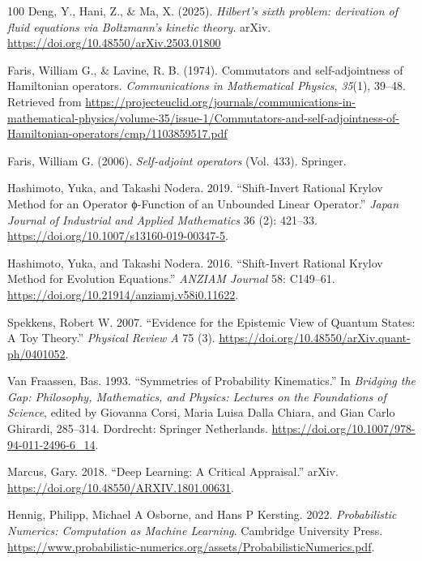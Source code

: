 \documentclass[11pt]{book}
\begin{document}
\begin{thebibliography}{100}
 Deng, Y., Hani, Z., \& Ma, X. (2025). \emph{Hilbert's sixth problem:
derivation of fluid equations via Boltzmann's kinetic theory}. arXiv.
\url{https://doi.org/10.48550/arXiv.2503.01800}

 Faris, William G., \& Lavine, R. B. (1974). Commutators and
self-adjointness of Hamiltonian operators. \emph{Communications in
Mathematical Physics}, \emph{35}(1), 39--48. Retrieved from
\url{https://projecteuclid.org/journals/communications-in-mathematical-physics/volume-35/issue-1/Commutators-and-self-adjointness-of-Hamiltonian-operators/cmp/1103859517.pdf}

 Faris, William G. (2006). \emph{Self-adjoint operators} (Vol. 433).
Springer.

 Hashimoto, Yuka, and Takashi Nodera. 2019. {``Shift-Invert Rational Krylov Method for an Operator
ϕ-Function of an Unbounded Linear Operator.''} \emph{Japan Journal of
Industrial and Applied Mathematics} 36 (2): 421--33.
\url{https://doi.org/10.1007/s13160-019-00347-5}.

 Hashimoto, Yuka, and Takashi Nodera. 2016. {``Shift-Invert Rational
Krylov Method for Evolution Equations.''} \emph{ANZIAM Journal} 58:
C149--61. \url{https://doi.org/10.21914/anziamj.v58i0.11622}.

 Spekkens, Robert W. 2007. {``Evidence for the Epistemic View of Quantum
States: A Toy Theory.''} \emph{Physical Review A} 75 (3).
\url{https://doi.org/10.48550/arXiv.quant-ph/0401052}.

 Van Fraassen, Bas. 1993. {``Symmetries of Probability Kinematics.''} In
\emph{Bridging the Gap: Philosophy, Mathematics, and Physics: Lectures
on the Foundations of Science}, edited by Giovanna Corsi, Maria Luisa
Dalla Chiara, and Gian Carlo Ghirardi, 285--314. Dordrecht: Springer
Netherlands. \url{https://doi.org/10.1007/978-94-011-2496-6_14}.

 Marcus, Gary. 2018. {``Deep Learning: A Critical Appraisal.''} arXiv.
\url{https://doi.org/10.48550/ARXIV.1801.00631}.

 Hennig, Philipp, Michael A Osborne, and Hans P Kersting. 2022.
\emph{Probabilistic Numerics: Computation as Machine Learning}.
Cambridge University Press.
\url{https://www.probabilistic-numerics.org/assets/ProbabilisticNumerics.pdf}.


\end{thebibliography}
\end{document}
